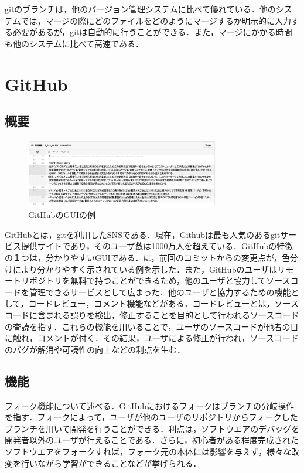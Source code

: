 \documentclass[a4j,9pt,twocolumn]{jsarticle}
\begin{document}
gitのブランチは，他のバージョン管理システムに比べて優れている．他のシステムでは，マージの際にどのファイルをどのようにマージするか明示的に入力する必要があるが，gitは自動的に行うことができる．また，マージにかかる時間も他のシステムに比べて高速である．

\section{GitHub}
\subsection{概要}

\begin{figure}[h]
\centering
\includegraphics[width=85mm]{img/github.eps}
\caption{GitHubのGUIの例}
\label{github}
\end{figure}

GitHubとは，gitを利用したSNSである．現在，Githubは最も人気のあるgitサービス提供サイトであり，そのユーザ数は1000万人を超えている\cite{github}．GitHubの特徴の１つは，分かりやすいGUIである．に，前回のコミットからの変更点が，色分けにより分かりやすく示されている例を示した．また，GitHubのユーザはリモートリポジトリを無料で持つことができるため，他のユーザと協力してソースコードを管理できるサービスとして広まった．他のユーザと協力するための機能として，コードレビュー，コメント機能などがある．コードレビューとは，ソースコードに含まれる誤りを検出，修正することを目的として行われるソースコードの査読を指す．これらの機能を用いることで，ユーザのソースコードが他者の目に触れ，コメントが付く．その結果，ユーザによる修正が行われ，ソースコードのバグが解消や可読性の向上などの利点を生む．

\subsection{機能}
フォーク機能について述べる．GitHubにおけるフォークはブランチの分岐操作を指す．フォークによって，ユーザが他のユーザのリポジトリからフォークしたブランチを用いて開発を行うことができる．利点は，ソフトウエアのデバッグを開発者以外のユーザが行えることである．さらに，初心者がある程度完成されたソフトウエアをフォークすれば，フォーク元の本体には影響を与えず，様々な改変を行いながら学習ができることなどが挙げられる．
\end{document}
